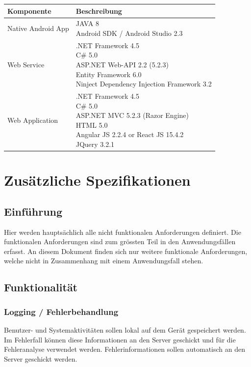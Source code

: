 \documentclass[a4paper,10pt,xetex]{article}
\makeatletter
\newcommand{\specialcell}[2][c]{%
  \begin{tabular}[#1]{@{}l@{}}#2\end{tabular}}
\makeatother
\begin{document}
\begin{longtabu} to \textwidth { | l | X[l] | }
\hline
\textbf{Komponente} & \textbf{Beschreibung} \\\hline
\endhead

Native Android App & \specialcell{JAVA 8\\Android SDK / Android Studio 2.3}\\\hline
Web Service & \specialcell{.NET Framework 4.5\\C\# 5.0\\ASP.NET Web-API 2.2 (5.2.3)\\Entity Framework 6.0\\Ninject Dependency Injection Framework 3.2}\\\hline
Web Application & \specialcell{.NET Framework 4.5\\C\# 5.0\\ASP.NET MVC 5.2.3 (Razor Engine)\\HTML 5.0\\Angular JS 2.2.4 or React JS 15.4.2\\JQuery 3.2.1}\\\hline
\end{longtabu}


\section{Zusätzliche Spezifikationen}\label{zusuxe4tzliche-spezifikationen}
\subsection{Einführung}\label{einfuxfchrung}
Hier werden hauptsächlich alle nicht funktionalen Anforderungen
definiert. Die funktionalen Anforderungen sind zum grössten Teil in den
Anwendungsfällen erfasst. An diesem Dokument finden sich nur weitere
funktionale Anforderungen, welche nicht in Zusammenhang mit einem
Anwendungsfall stehen.


\subsection{Funktionalität}\label{funktionalituxe4t}
\subsubsection{Logging / Fehlerbehandlung}\label{logging-fehlerbehandlung}
Benutzer- und Systemaktivitäten sollen lokal auf dem Gerät gespeichert
werden. Im Fehlerfall können diese Informationen an den Server geschickt
und für die Fehleranalyse verwendet werden. Fehlerinformationen sollen
automatisch an den Server geschickt werden.
\end{document}
